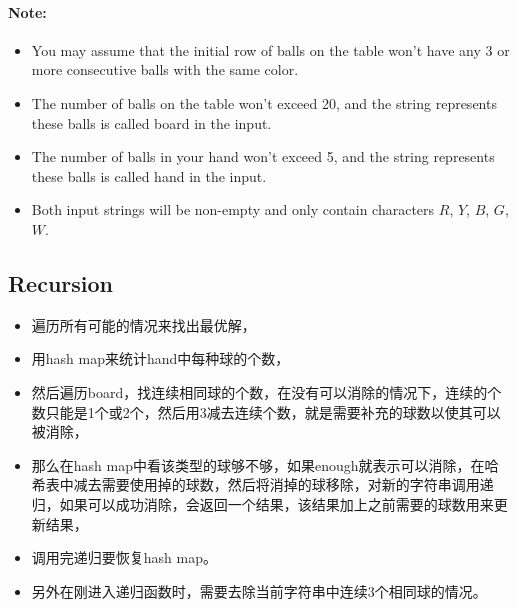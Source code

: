\paragraph{Note:}
\begin{itemize}
\item You may assume that the initial row of balls on the table won’t have any 3 or more consecutive balls with the same color.
\item The number of balls on the table won't exceed 20, and the string represents these balls is called board in the input.
\item The number of balls in your hand won't exceed 5, and the string represents these balls is called hand in the input.
\item Both input strings will be non-empty and only contain characters $ R $, $ Y $, $ B $, $ G $, $ W $.
\end{itemize}

\subsection{Recursion}

\begin{itemize}
\item 遍历所有可能的情况来找出最优解，
\item 用hash map来统计hand中每种球的个数，
\item 然后遍历board，找连续相同球的个数，在没有可以消除的情况下，连续的个数只能是1个或2个，然后用3减去连续个数，就是需要补充的球数以使其可以被消除，
\item 那么在hash map中看该类型的球够不够，如果enough就表示可以消除，在哈希表中减去需要使用掉的球数，然后将消掉的球移除，对新的字符串调用递归，如果可以成功消除，会返回一个结果，该结果加上之前需要的球数用来更新结果，
\item 调用完递归要恢复hash map。
\item 另外在刚进入递归函数时，需要去除当前字符串中连续3个相同球的情况。
\end{itemize}

